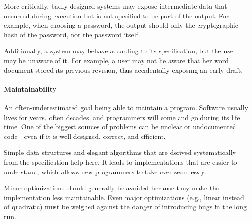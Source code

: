 More critically, badly designed systems may expose intermediate data that occurred during execution but is not specified to be part of the output.
For example, when choosing a password, the output should only the cryptographic hash of the password, not the password itself.

Additionally, a system may behave according to its specification, but the user may be unaware of it.
For example, a user may not be aware that her word document stored its previous revision, thus accidentally exposing an early draft.

\paragraph{Maintainability}
An often-underestimated goal being able to maintain a program.
Software usually lives for years, often decades, and programmers will come and go during its life time.
One of the biggest sources of problems can be unclear or undocumented code---even if it is well-designed, correct, and efficient.

Simple data structures and elegant algorithms that are derived systematically from the specification help here.
It leads to implementations that are easier to understand, which allows new programmers to take over seamlessly.

Minor optimizations should generally be avoided because they make the implementation less maintainable.
Even major optimizations (e.g., linear instead of quadratic) must be weighed against the danger of introducing bugs in the long run.
